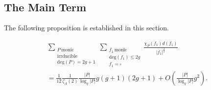 \documentclass[11pt]{amsart}
\begin{document}
\subsection{The Main Term} The following proposition is established in this section.

\begin{prop}
\label{prop4.5}
\begin{multline}
\sum_{\substack{P \ \mathrm{monic} \\ \mathrm{irrducible} \\ \mathrm{deg}(P)=2g+1}}\sum_{\substack{f_{1} \ \mathrm{monic} \\ \mathrm{deg}(f_{1})\leq2g \\ f_{1}=\square}}\frac{\chi_{P}(f_{1})d(f_{1})}{|f_{1}|^{\tfrac{1}{2}}}\\
=\frac{1}{12}\frac{1}{\zeta_{A}(2)}\frac{|P|}{\log_{q}|P|}g(g+1)(2g+1)+O\left(\frac{|P|}{\log_{q}|P|}g^{2}\right).\nonumber
\end{multline}
\end{prop}
\end{document}
